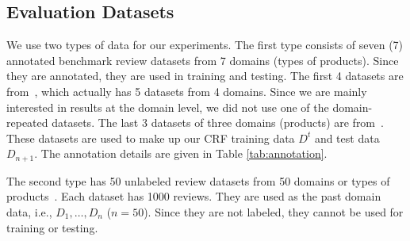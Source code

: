 \documentclass[11pt,a4paper]{article}
\theoremstyle{definition}
\begin{document}
\subsection{Evaluation Datasets}
    We use two types of data for our experiments. The first type consists of seven (7) annotated benchmark review datasets from 7 domains (types of products). Since they are annotated, they are used in training and testing. The first 4 datasets are from~\cite{HuL2004}, which actually has 5 datasets from 4 domains. Since we are mainly interested in results at the domain level, we did not use one of the domain-repeated datasets. The last 3 datasets of three domains (products) are from~\cite{liu2016improving}. These datasets are used to make up our CRF training data $D^t$ and test data $D_{n+1}$. The annotation details are given in Table \ref{tab:annotation}. 
    
    
    
    
    
    The second type has 50 unlabeled review datasets from 50 domains or types of products~\cite{ChenLiu2014ICML}. Each dataset has 1000 reviews. They are used as the past domain data, i.e., $D_1, \dots, D_n$ ($n=50$). Since they are not labeled, they cannot be used for training or testing. %
    
    
    
\end{document}
